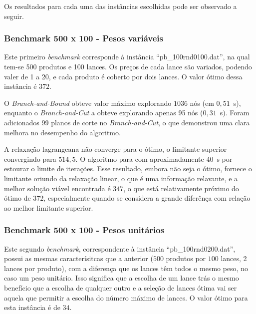 \documentclass{article}
\begin{document}
    Os resultados para cada uma das instâncias escolhidas pode ser observado a seguir. 
    
    
    \subsubsection{Benchmark 500 x 100 - Pesos variáveis}%
    \label{sec:res:ssec:bchmrk1}
    
    Este primeiro \emph{benchmark} corresponde à instância \enquote{pb\_100rnd0100.dat}, na qual tem-se 500 produtos e 100 lances. Os preços de cada lance são variados, podendo valer de 1 a 20, e cada produto é coberto por dois lances. O valor ótimo dessa instância é $372$.
    
    O \emph{Branch-and-Bound} obteve valor máximo explorando $ 1036 $ nós (em $ 0{,}51 $~s), enquanto o \emph{Branch-and-Cut} a obteve explorando apenas 95 nós ($ 0{,}31 $~s). Foram adicionados 99 planos de corte no \emph{Branch-and-Cut}, o que demonstrou uma clara melhora no desempenho do algoritmo.
    
    A relaxação lagrangeana não converge para o ótimo, o limitante superior convergindo para $ 514{,}5 $. O algoritmo para com aproximadamente $40$~s por estourar o limite de iterações.  Esse resultado, embora não seja o ótimo, fornece o limitante oriundo da relaxação linear, o que é uma informação relavante, e a melhor solução viável encontrada é $347$, o que está relativamente próximo do ótimo de $372$, especialmente quando se considera a grande diferênça com relação ao melhor limitante superior.
    
    
    \subsubsection{Benchmark 500 x 100 - Pesos unitários}
    
    Este segundo \emph{benchmark}, correspondente à instância \enquote{pb\_100rnd0200.dat}, possui as mesmas caracterísitcas que a anterior ($500$ produtos por $100$ lances, 2 lances por produto), com a diferença que os lances têm todos o mesmo peso, no caso um peso unitário. Isso significa que a escolha de um lance trás o mesmo benefício que a escolha de qualquer outro e a seleção de lances ótima vai ser aquela que permitir a escolha do número máximo de lances. O valor ótimo para esta instância é de $34$.
    
\end{document}
